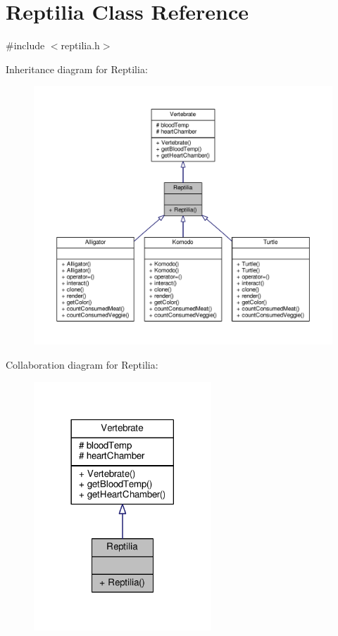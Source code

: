 \hypertarget{classReptilia}{}\section{Reptilia Class Reference}
\label{classReptilia}


{\ttfamily \#include $<$reptilia.\+h$>$}



Inheritance diagram for Reptilia\+:
\nopagebreak
\begin{figure}[H]
\begin{center}
\leavevmode
\includegraphics[width=350pt]{classReptilia__inherit__graph}
\end{center}
\end{figure}


Collaboration diagram for Reptilia\+:
\nopagebreak
\begin{figure}[H]
\begin{center}
\leavevmode
\includegraphics[width=189pt]{classReptilia__coll__graph}
\end{center}
\end{figure}
